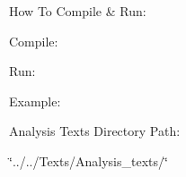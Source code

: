 How To Compile \& Run\+:

Compile\+: 
\begin{DoxyCode}{0}

\end{DoxyCode}
 Run\+: 
\begin{DoxyCode}{0}

\end{DoxyCode}



\begin{DoxyItemize}
\item Example\+: 
\begin{DoxyCode}{0}

\end{DoxyCode}

\end{DoxyItemize}

Analysis Texts Directory Path\+:


\begin{DoxyItemize}
\item \char`\"{}../../\+Texts/\+Analysis\+\_\+texts/\char`\"{} 
\end{DoxyItemize}